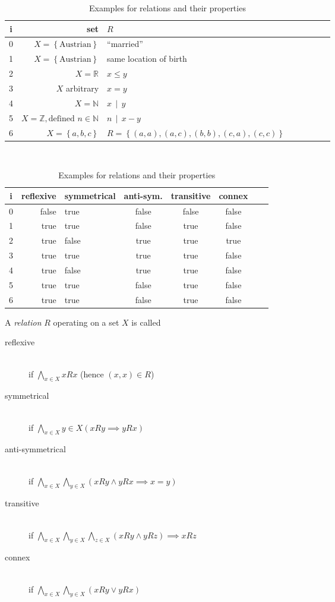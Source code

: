 \documentclass[a4paper,landscape,twocolumn]{article}
\newcommand\set[1]{\left\{#1\right\}}
\newcommand\divides[2]{#1\,\mid\,#2}
\begin{document}
\begin{table}[!ht]
  \begin{center}
    \begin{tabular}{crlccccc}
     \hline \hline
      i & set & $R$ \\
     \hline
      0 & $X = \set{\text{Austrian}}$ & \enquote{married} \\
      1 & $X = \set{\text{Austrian}}$ & same location of birth \\
      2 & $X = \mathbb{R}$ & $x \leq y$ \\
      3 & $X$ arbitrary & $x = y$ \\
      4 & $X = \mathbb{N}$ & $\divides{x}{y}$ \\
      5 & $X = \mathbb{Z}, \text{defined } n \in \mathbb{N}$ & $\divides{n}{x - y}$ \\
      6 & $X = \set{a, b, c}$ & $R = \set{(a, a), (a, c), (b, b), (c, a), (c, c)}$ \\
     \hline \hline
    \end{tabular} \\[5pt]
    \begin{tabular}{crlccccc}
     \hline \hline
        i & reflexive & symmetrical & anti-sym. & transitive & connex \\
     \hline
        0 & false & true & false & false & false \\
        1 & true & true & false & true & false \\
        2 & true & false & true & true & true \\
        3 & true & true & true & true & false \\
        4 & true & false & true & true & false \\
        5 & true & true & false & true & false \\
        6 & true & true & false & true & false \\
     \hline \hline
    \end{tabular}
    \caption{Examples for relations and their properties}
  \end{center}
\end{table}

A \emph{relation} $R$ operating on a set $X$ is called
\begin{description}
  \item[reflexive] \hfill{} \\
    if $\bigwedge_{x \in X} x R x$ (hence $(x, x) \in R$)
  \item[symmetrical] \hfill{} \\
    if $\bigwedge_{x \in X}{y \in X} \left(xRy \implies yRx\right)$
  \item[anti-symmetrical] \hfill{} \\
    if $\bigwedge_{x \in X} \bigwedge_{y \in X} (xRy \land yRx \implies x=y)$
  \item[transitive] \hfill{} \\
    if $\bigwedge_{x \in X} \bigwedge_{y \in X} \bigwedge_{z \in X} (xRy \land yRz) \implies xRz$
  \item[connex] \hfill{} \\
    if $\bigwedge_{x \in X} \bigwedge_{y \in X} (xRy \lor yRx)$
\end{description}
\end{document}
